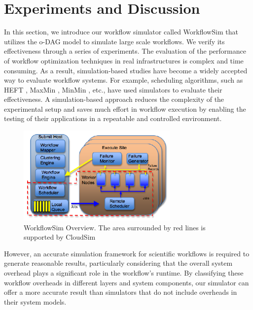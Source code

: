 \section{Experiments and Discussion}

In this section, we introduce our workflow simulator called WorkflowSim that utilizes the o-DAG model to simulate large scale workflows. We verify its effectiveness through a series of experiments. The evaluation of the performance of workflow optimization techniques in real infrastructures is complex and time consuming. As a result, simulation-based studies have become a widely accepted way to evaluate workflow systems. For example, scheduling algorithms, such as HEFT \cite{Topcuoglu2002}, MaxMin \cite{Braun2001}, MinMin \cite{Blythe2005}, etc., have used simulators to evaluate their effectiveness. A simulation-based approach reduces the complexity of the experimental setup and saves much effort in workflow execution by enabling the testing of their applications in a repeatable and controlled environment. 


\begin{figure}[h!]
	\centering
    \includegraphics[width=0.7\textwidth]{figures/model/wfs_overview.pdf}
    \caption{WorkflowSim Overview. The area surrounded by red lines is supported by CloudSim}
    \label{fig:model_wfs_overview}
\end{figure}

However, an accurate simulation framework for scientific workflows is required to generate reasonable results, particularly considering that the overall system overhead \cite{Overhead2011} plays a significant role in the workflow’s runtime. 
By classifying these workflow overheads in different layers and system components, our simulator can offer a more accurate result than simulators that do not include overheads in their system models.

